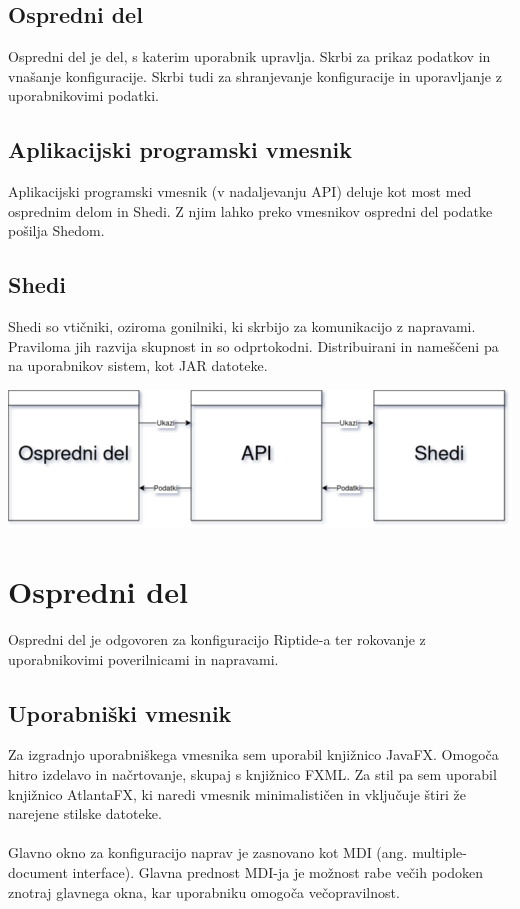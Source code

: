 \documentclass[12pt]{article}
\begin{document}
\subsection{Ospredni del}
Ospredni del je del, s katerim uporabnik upravlja. Skrbi za prikaz podatkov
in vnašanje konfiguracije. Skrbi tudi za shranjevanje konfiguracije in
uporavljanje z uporabnikovimi podatki.

\subsection{Aplikacijski programski vmesnik}
Aplikacijski programski vmesnik (v nadaljevanju API) deluje kot most med
osprednim delom in Shedi. Z njim lahko preko vmesnikov ospredni del podatke
pošilja Shedom.

\subsection{Shedi}
Shedi so vtičniki, oziroma gonilniki, ki skrbijo za komunikacijo z 
napravami. Praviloma jih razvija skupnost in so odprtokodni. Distribuirani
in nameščeni pa na uporabnikov sistem, kot JAR datoteke.

\begin{center}
	\includegraphics[scale=0.5]{slike/zgradba.png}
\end{center}
\newpage

\section{Ospredni del}
Ospredni del je odgovoren za konfiguracijo Riptide-a ter rokovanje z 
uporabnikovimi poverilnicami in napravami.

\subsection{Uporabniški vmesnik}
Za izgradnjo uporabniškega vmesnika sem uporabil knjižnico JavaFX. Omogoča
hitro izdelavo in načrtovanje, skupaj s knjižnico FXML. Za stil pa sem
uporabil knjižnico AtlantaFX, ki naredi vmesnik minimalističen in vključuje
štiri že narejene stilske datoteke.
\\\\
Glavno okno za konfiguracijo naprav je zasnovano kot MDI (ang.
multiple-document interface). Glavna prednost MDI-ja je možnost rabe večih
podoken znotraj glavnega okna, kar uporabniku omogoča večopravilnost.
\end{document}
